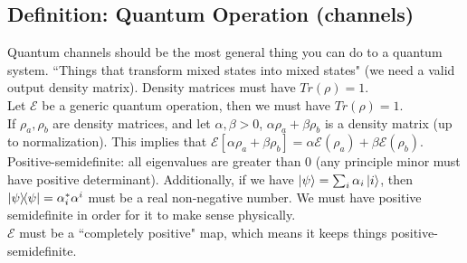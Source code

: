 \subsection{Definition: Quantum Operation (channels)}
Quantum channels should be the most general thing you can do to a quantum system. ``Things that transform mixed states into mixed states" (we need a valid output density matrix). Density matrices must have $Tr(\rho) = 1$. \\
Let $\mathcal{E}$ be a generic quantum operation, then we must have $Tr(\mathcal{\rho}) = 1$.\\
If $\rho_a,\rho_b$ are density matrices, and let $\alpha,\beta > 0$, $\alpha\rho_a + \beta\rho_b$ is a density matrix (up to normalization). This implies that $\mathcal{E}[\alpha\rho_a + \beta\rho_b] = \alpha \mathcal{E}(\rho_a) + \beta \mathcal{E}(\rho_b)$. \\
Positive-semidefinite: all eigenvalues are greater than 0 (any principle minor must have positive determinant). Additionally, if we have $\ket{\psi} = \sum_i \alpha_i \ket{i}$, then $\ketbra{\psi} = \alpha_i^* \alpha^i$ must be a real non-negative number. We must have positive semidefinite in order for it to make sense physically. \\
$\mathcal{E}$ must be a ``completely positive" map, which means it keeps things positive-semidefinite. 

